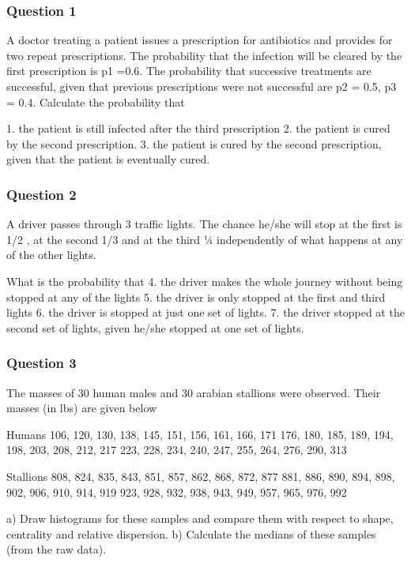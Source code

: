\documentclass[12pt]{report}
\begin{document}
{{\subsubsection{Question 1}

A doctor treating a patient issues a prescription for antibiotics and provides for two repeat prescriptions. The probability that the infection will be cleared by the first prescription is p1 =0.6. 
The probability that successive treatments are successful, given that previous prescriptions were not successful are p2 = 0.5, p3 = 0.4. Calculate the probability that  

1.	the patient is still infected after the third prescription
2.	the patient is cured by the second prescription.
3.	the patient is cured by the second prescription, given that the patient is eventually cured.


\subsubsection{Question 2}
A driver passes through 3 traffic lights. The chance he/she will stop at the first is 1/2 , at the second 1/3 and at the third ¼ independently of what happens at any of the other lights. 

What is the probability that
4.	the driver makes the whole journey without being stopped at any of the lights
5.	the driver is only stopped at the first and third lights
6.	the driver is stopped at just one set of lights.
7.	the driver stopped at the second set of lights, given he/she stopped at one set of lights.

\subsubsection{Question 3}
The masses of 30 human males and 30 arabian stallions were observed. Their masses (in lbs) are given below

Humans
106, 120, 130, 138, 145, 151, 156, 161, 166, 171
176, 180, 185, 189, 194, 198, 203, 208, 212, 217
223, 228, 234, 240, 247, 255, 264, 276, 290, 313



Stallions
808, 824, 835, 843, 851, 857, 862, 868, 872, 877
881, 886, 890, 894, 898, 902, 906, 910, 914, 919
923, 928, 932, 938, 943, 949, 957, 965, 976, 992


a)	Draw histograms for these samples and compare them with respect to shape, centrality and relative dispersion. 
b)	Calculate the medians of these samples (from the raw data).


}}
\end{document}
